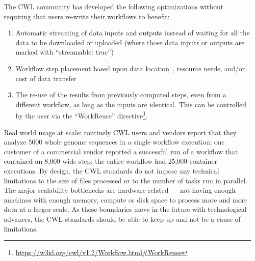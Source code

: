 \documentclass[sigconf,authordraft]{acmart}
\begin{document}
{The CWL community has developed the following optimizations without requiring that users re-write their workflows to benefit:
\begin{enumerate}
\item Automatic streaming of data inputs and outputs instead of waiting for all the data to be downloaded or uploaded (where those data inputs or outputs are marked with ``streamable: true'')
\item Workflow step placement based upon data location~\cite{jiang_tr-19-01_2019}, resource needs, and/or cost of data transfer~\cite{jiang_pivot_2019}
\item {}The re-use of the results from previously computed steps, even from a different workflow, as long as the inputs are identical. This can be controlled by the user via the ``WorkReuse'' directive\footnote{\url{https://w3id.org/cwl/v1.2/Workflow.html\#WorkReuse}}.
\end{enumerate}

Real world usage at scale: routinely CWL users and vendors report that they analyze 5000 whole genome sequences in a single workflow execution; one customer of a commercial vendor reported a successful run of a workflow that contained an 8,000-wide step; the entire workflow had 25,000 container executions. By design, the CWL standards do not impose any technical limitations to the size of files processed or to the number of tasks run in parallel. The major scalability bottlenecks are hardware-related --- not having enough machines with enough memory, compute or disk space to process more and more data at a larger scale. As these boundaries move in the future with technological advances, the CWL standards should be able to keep up and not be a cause of limitations.
}
\end{document}

